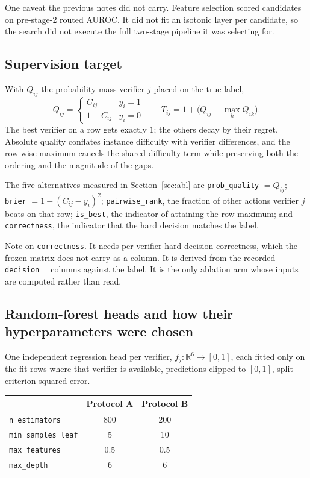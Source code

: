 \documentclass[10pt,a4paper]{article}
\newcommand{\fix}[1]{\textcolor{red!65!black}{#1}}
\begin{document}
\fix{One caveat the previous notes did not carry.} Feature selection scored candidates on
pre-stage-2 routed AUROC. It did not fit an isotonic layer per candidate, so the search did not
execute the full two-stage pipeline it was selecting for.

\subsection{Supervision target}

With $Q_{ij}$ the probability mass verifier $j$ placed on the true label,
\[
Q_{ij}=\begin{cases}C_{ij}&y_i=1\\ 1-C_{ij}&y_i=0\end{cases}
\qquad
T_{ij}=1+\bigl(Q_{ij}-\max_k Q_{ik}\bigr).
\]
The best verifier on a row gets exactly $1$; the others decay by their regret. Absolute quality
conflates instance difficulty with verifier differences, and the row-wise maximum cancels the
shared difficulty term while preserving both the ordering and the magnitude of the gaps.

The five alternatives measured in Section~\ref{sec:abl} are \texttt{prob\_quality} $=Q_{ij}$;
\texttt{brier} $=1-(C_{ij}-y_i)^2$; \texttt{pairwise\_rank}, the fraction of other actions
verifier $j$ beats on that row; \texttt{is\_best}, the indicator of attaining the row maximum;
and \texttt{correctness}, the indicator that the hard decision matches the label.

\fix{Note on \texttt{correctness}.} It needs per-verifier hard-decision correctness, which the
frozen matrix does not carry as a column. It is derived from the recorded \texttt{decision\_\_}
columns against the label. It is the only ablation arm whose inputs are computed rather than read.

\subsection{Random-forest heads and how their hyperparameters were chosen}

One independent regression head per verifier, $f_j:\mathbb{R}^{6}\to[0,1]$, each fitted only on
the fit rows where that verifier is available, predictions clipped to $[0,1]$, split criterion
squared error.

\begin{center}\small
\begin{tabular}{lcc}
\toprule
 & Protocol A & Protocol B \\
\midrule
\texttt{n\_estimators} & 800 & 200 \\
\texttt{min\_samples\_leaf} & 5 & 10 \\
\texttt{max\_features} & 0.5 & 0.5 \\
\texttt{max\_depth} & 6 & 6 \\
\bottomrule
\end{tabular}
\end{center}
\end{document}
